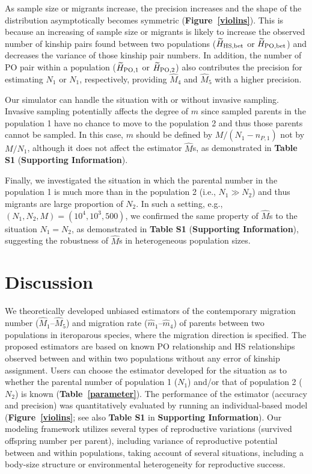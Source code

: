 \documentclass[12pt, English]{article}
\begin{document}
\begin{spacing}{1.9}
As sample size or migrants increase, the precision increases and the shape of the distribution asymptotically becomes symmetric ({\bf Figure~\ref{violins}}). This is because an increasing of sample size or migrants is likely to increase the observed number of kinship pairs found between two populations ($\widetilde{H}_{\rm HS,bet}$ or $\widetilde{H}_{\rm PO,bet}$) and decreases the variance of those kinship pair numbers. In addition, the number of PO pair within a population ($\widetilde{H}_{\rm PO,1}$ or $\widetilde{H}_{\rm PO,2}$) also contributes the precision for estimating $N_1$ or $N_1$, respectively, providing ${\hat M_4}$ and ${\hat M_5}$ with a higher precision. 

Our simulator can handle the situation with or without invasive sampling. Invasive sampling potentially affects the degree of $m$ since sampled parents in the population 1 have no chance to move to the population 2 and thus those parents cannot be sampled. In this case, $m$ should be defined by $M/(N_1-n_{P,1})$ not by $M/N_1$, although it does not affect the estimator ${\hat M}$s, as demonstrated in {\bf Table S1} ({\bf Supporting Information}). 

Finally, we investigated the situation in which the parental number in the population 1 is much more than in the population 2 (i.e., $N_1 \gg N_2$) and thus migrants are large proportion of $N_2$. In such a setting, e.g., $(N_1,N_2,M)=(10^4,10^3,500)$, we confirmed the same property of ${\hat M}$s to the situation $N_1 = N_2$, as demonstrated in {\bf Table S1} ({\bf Supporting Information}), suggesting the robustness of ${\hat M}$s in heterogeneous population sizes.   

\section{Discussion}\label{sec4}

We theoretically developed unbiased estimators of the contemporary migration number (${\hat M_1}$--${\hat M_5}$) and migration rate (${\hat m_1}$--${\hat m_4}$) of parents between two populations in iteroparous species, where the migration direction is specified. The proposed estimators are based on known PO relationship and HS relationships observed between and within two populations without any error of kinship assignment. Users can choose the estimator developed for the situation as to whether the parental number of population 1 ($N_1$) and/or that of population 2 ($N_2$) is known ({\bf Table~\ref{parameter}}). The performance of the estimator (accuracy and precision) was quantitatively evaluated by running an individual-based model ({\bf Figure~\ref{violins}}; see also {\bf Table S1} in {\bf Supporting Information}). Our modeling framework utilizes several types of reproductive variations (survived offspring number per parent), including variance of reproductive potential between and within populations, taking account of several situations, including a body-size structure or environmental heterogeneity for reproductive success.


\end{spacing}
\end{document}

